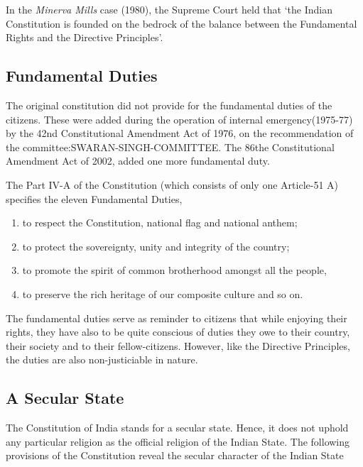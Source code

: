 \begin{multicols}{2}
In the { \textit{Minerva Mills}} case (1980), the Supreme Court held that `the Indian Constitution is founded on the bedrock of the balance between the Fundamental Rights and the Directive Principles'.

\subsection{Fundamental Duties}

The original constitution did not provide for the fundamental duties of the citizens. These were added during the operation of internal emergency(1975-77) by the 42nd Constitutional Amendment Act of 1976, on the recommendation of the \gls{committee:SWARAN-SINGH-COMMITTEE}. The 86the Constitutional Amendment Act of 2002, added one more fundamental duty.

The Part IV-A of the Constitution (which consists of only one Article-51 A) specifies the eleven Fundamental Duties,

\renewcommand{\labelenumi}{\textbf{(\alph{enumi})}}
\begin{enumerate}
  \item to respect the Constitution, national flag and national anthem;
  \item to protect the sovereignty, unity and integrity of the country;
  \item to promote the spirit of common brotherhood amongst all the people,
  \item to preserve the rich heritage of our composite culture and so on.
\end{enumerate}

The fundamental duties serve as reminder to citizens that while enjoying their rights, they have also to be quite conscious of duties they owe to their country, their society and to their fellow-citizens. However, like the Directive Principles, the duties are also non-justiciable in nature.


\subsection{A Secular State}

The Constitution of India stands for a secular state. Hence, it does not uphold any particular religion as the official religion of the Indian State. The following provisions of the Constitution reveal the secular character of the Indian State


\end{multicols}
